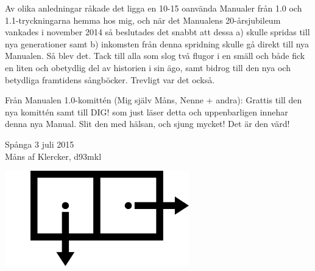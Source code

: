 \documentclass[a6paper,fontsize=10pt,twoside,open=right]{scrbook}
\begin{document}
Av olika anledningar råkade det ligga en 10-15
oanvända Manualer från 1.0 och 1.1-tryckningarna hemma hos mig, och
när det Manualens 20-årsjubileum vankades i november 2014 så
beslutades det snabbt att dessa a) skulle spridas till nya
generationer samt b) inkomsten från denna spridning skulle gå direkt
till nya Manualen. Så blev det. Tack till alla som slog två flugor i
en smäll och både fick en liten och obetydlig del av historien i sin
ägo, samt bidrog till den nya och betydliga framtidens
sångböcker. Trevligt var det också.

Från Manualen 1.0-komittén (Mig själv Måns,
Nenne + andra): Grattis till den nya komittén samt till DIG! som just
läser detta och uppenbarligen innehar denna nya Manual. Slit den med
hälsan, och sjung mycket! Det är den värd!\par
\vspace{10pt}
\noindent Spånga 3 juli 2015\\
Måns af Klercker, d93mkl\par
\setlength{\parindent}{0pt}
\vfill
\begin{center}
  \noindent\includegraphics[keepaspectratio,width=0.6\textwidth]{elements/consbox.pdf}
\end{center}
\vfill
\null
\newpage

\vspace{15pt}

\newpage

\newpage

\newpage

\newpage

\newpage

\newpage

\newpage

\vfill
{}
\end{document}
